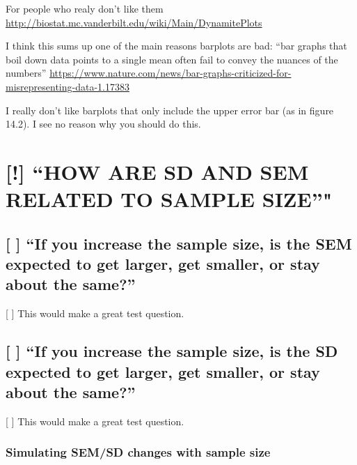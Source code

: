 \documentclass[]{book}
\theoremstyle{definition}
\theoremstyle{definition}
\theoremstyle{definition}
\theoremstyle{remark}
\begin{document}
For people who realy don't like them
\url{http://biostat.mc.vanderbilt.edu/wiki/Main/DynamitePlots}

I think this sums up one of the main reasons barplots are bad: ``bar
graphs that boil down data points to a single mean often fail to convey
the nuances of the numbers''
\url{https://www.nature.com/news/bar-graphs-criticized-for-misrepresenting-data-1.17383}

I really don't like barplots that only include the upper error bar (as
in figure 14.2). I see no reason why you should do this.

\section{\texorpdfstring{{[}!{]} ``HOW ARE SD AND SEM RELATED TO SAMPLE
SIZE''"}{{[}!{]} HOW ARE SD AND SEM RELATED TO SAMPLE SIZE"}}\label{how-are-sd-and-sem-related-to-sample-size}

\subsection{\texorpdfstring{{[} {]} ``If you increase the sample size,
is the SEM expected to get larger, get smaller, or stay about the
same?''}{{[} {]} If you increase the sample size, is the SEM expected to get larger, get smaller, or stay about the same?}}\label{if-you-increase-the-sample-size-is-the-sem-expected-to-get-larger-get-smaller-or-stay-about-the-same}

{[} {]} This would make a great test question.

\subsection{\texorpdfstring{{[} {]} ``If you increase the sample size,
is the SD expected to get larger, get smaller, or stay about the
same?''}{{[} {]} If you increase the sample size, is the SD expected to get larger, get smaller, or stay about the same?}}\label{if-you-increase-the-sample-size-is-the-sd-expected-to-get-larger-get-smaller-or-stay-about-the-same}

{[} {]} This would make a great test question.

\subsubsection{Simulating SEM/SD changes with sample
size}\label{simulating-semsd-changes-with-sample-size}
\end{document}
